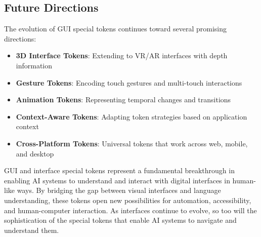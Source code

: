 \subsection{Future Directions}

The evolution of GUI special tokens continues toward several promising directions:

\begin{itemize}
\item \textbf{3D Interface Tokens}: Extending to VR/AR interfaces with depth information
\item \textbf{Gesture Tokens}: Encoding touch gestures and multi-touch interactions
\item \textbf{Animation Tokens}: Representing temporal changes and transitions
\item \textbf{Context-Aware Tokens}: Adapting token strategies based on application context
\item \textbf{Cross-Platform Tokens}: Universal tokens that work across web, mobile, and desktop
\end{itemize}

GUI and interface special tokens represent a fundamental breakthrough in enabling AI systems to understand and interact with digital interfaces in human-like ways. By bridging the gap between visual interfaces and language understanding, these tokens open new possibilities for automation, accessibility, and human-computer interaction. As interfaces continue to evolve, so too will the sophistication of the special tokens that enable AI systems to navigate and understand them.
